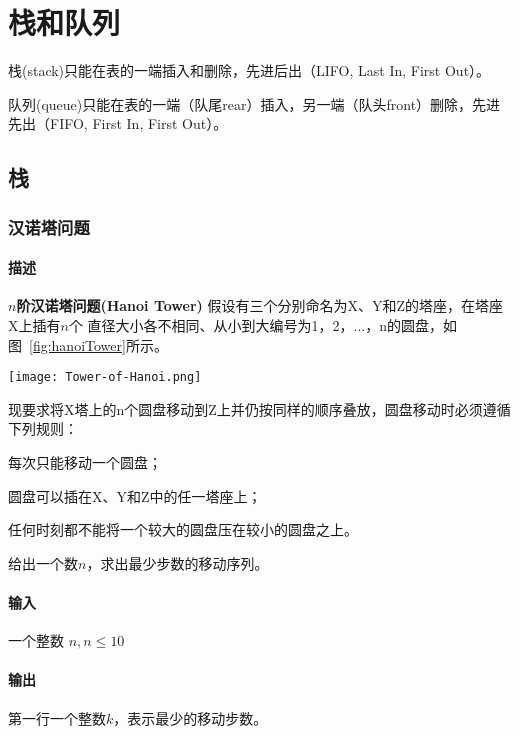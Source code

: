 \chapter{栈和队列}

栈(stack)只能在表的一端插入和删除，先进后出（LIFO, Last In, First Out）。

队列(queue)只能在表的一端（队尾rear）插入，另一端（队头front）删除，先进先出（FIFO, First In, First Out）。

\section{栈} %


\subsection{汉诺塔问题}


\subsubsection{描述}
\textbf{$n$阶汉诺塔问题(Hanoi Tower)} 假设有三个分别命名为X、Y和Z的塔座，在塔座X上插有$n$个
直径大小各不相同、从小到大编号为1，2，...，n的圆盘，如图~\ref{fig:hanoiTower}所示。

\begin{center}
\texttt{[image: Tower-of-Hanoi.png]}\\
\label{fig:hanoiTower}
\end{center}


现要求将X塔上的n个圆盘移动到Z上并仍按同样的顺序叠放，圆盘移动时必须遵循下列规则：
\begindot
\item 每次只能移动一个圆盘；
\item 圆盘可以插在X、Y和Z中的任一塔座上；
\item 任何时刻都不能将一个较大的圆盘压在较小的圆盘之上。
\myenddot
 
给出一个数$n$，求出最少步数的移动序列。


\subsubsection{输入}
一个整数 $n, n \leq 10$


\subsubsection{输出}
第一行一个整数$k$，表示最少的移动步数。

